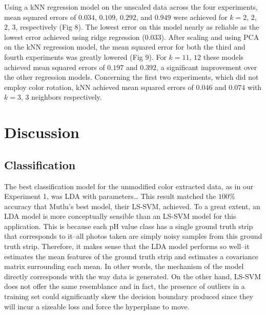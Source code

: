 \documentclass[journal]{IEEEtran}
\begin{document}
Using a kNN regression model on the unscaled data across the four experiments, mean squared errors of $0.034$, $0.109$, $0.292$, and $0.949$ were achieved for $k=2$, $2$, $2$, $3$, respectively (Fig 8). The lowest error on this model nearly as reliable as the lowest error achieved using ridge regression ($0.033$). After scaling and using PCA on the kNN regression model, the mean squared error for both the third and fourth experiments was greatly lowered (Fig 9). For $k=11$, $12$ these models achieved mean squared errors of $0.197$ and $0.392$, a significant improvement over the other regression models. Concerning the first two experiments, which did not employ color rotation, kNN achieved mean squared errors of $0.046$ and $0.074$ with $k=3$, $3$ neighbors respectively.















\section{Discussion}
\subsection{Classification}
The best classification model for the unmodified color extracted data, as in our Experiment 1, was LDA with parameters… This result matched the $100\%$ accuracy that Mutlu’s best model, their LS-SVM, achieved. To a great extent, an LDA model is more conceptually sensible than an LS-SVM model for this application. This is because each pH value class has a single ground truth strip that corresponds to it--all photos taken are simply noisy samples from this ground truth strip. Therefore, it makes sense that the LDA model performs so well--it estimates the mean features of the ground truth strip and estimates a covariance matrix surrounding each mean. In other words, the mechanism of the model directly corresponds with the way data is generated. On the other hand, LS-SVM does not offer the same resemblance and in fact, the presence of outliers in a training set could significantly skew the decision boundary produced since they will incur a sizeable loss and force the hyperplane to move.
\end{document}

